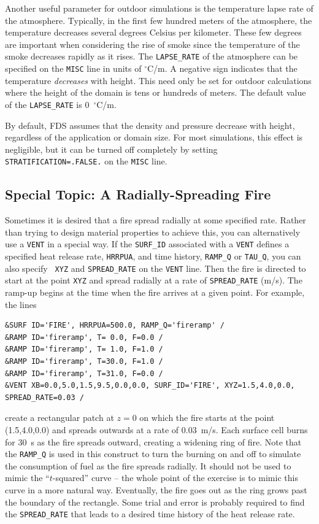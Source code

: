 \documentclass[11pt]{book}
\newcommand{\ct}{\tt\small}
\begin{document}
Another useful parameter for outdoor simulations is the temperature
lapse rate of the atmosphere. Typically, in the first few hundred meters
of the atmosphere, the temperature decreases several degrees Celsius
per kilometer. These few degrees are important when considering the rise
of smoke since the temperature of the smoke decreases rapidly as it
rises. The {\ct LAPSE\_RATE} of the atmosphere can be specified on the
{\ct MISC} line in units of $^\circ$C/m. A negative sign indicates that the
temperature {\em decreases} with height.
This need only be set for outdoor calculations where the height of the
domain is tens or hundreds of meters.
The default value of the {\ct LAPSE\_RATE} is 0~$^\circ$C/m.

By default, FDS assumes that the density and pressure decrease with height, regardless of the
application or domain size. For most simulations, this effect is negligible, but it can be
turned off completely by setting {\ct STRATIFICATION=.FALSE.} on the {\ct MISC} line.


\subsection{Special Topic: A Radially-Spreading Fire}
\label{info:spread}

Sometimes it is desired that a fire spread radially at some specified
rate. Rather than trying to design material properties
to achieve this, you can alternatively use a {\ct VENT} in a special way.
If the {\ct SURF\_ID} associated with a {\ct VENT}
defines a specified heat release rate, {\ct HRRPUA}, and
time history, {\ct RAMP\_Q} or {\ct TAU\_Q}, you can also specify {\ct
XYZ} and {\ct SPREAD\_RATE} on the {\ct VENT} line.
Then the fire is directed to start at the point {\ct XYZ} and spread
radially at a rate of {\ct SPREAD\_RATE} (m/s). The ramp-up begins at
the time when the fire arrives at a given point.
For example, the lines

\footnotesize
\begin{verbatim}
&SURF ID='FIRE', HRRPUA=500.0, RAMP_Q='fireramp' /
&RAMP ID='fireramp', T= 0.0, F=0.0 /
&RAMP ID='fireramp', T= 1.0, F=1.0 /
&RAMP ID='fireramp', T=30.0, F=1.0 /
&RAMP ID='fireramp', T=31.0, F=0.0 /
&VENT XB=0.0,5.0,1.5,9.5,0.0,0.0, SURF_ID='FIRE', XYZ=1.5,4.0,0.0, SPREAD_RATE=0.03 /
\end{verbatim}
\normalsize
create a rectangular patch at $z=0$ on which the fire starts at the
point (1.5,4.0,0.0) and spreads outwards at a rate of 0.03~m/s. Each surface cell
burns for 30~s as the fire spreads outward, creating a widening ring of fire. Note that the {\ct RAMP\_Q} is used in this
construct to turn the burning on and off to simulate the consumption of fuel as the fire spreads radially. It should not
be used to mimic the ``$t$-squared'' curve -- the whole point of the exercise is to mimic this curve in a more natural way.
Eventually, the fire goes out as the ring grows past the boundary of the rectangle.
Some trial and error is probably required to find the {\ct SPREAD\_RATE} that
leads to a desired time history of the heat release rate.
\end{document}
